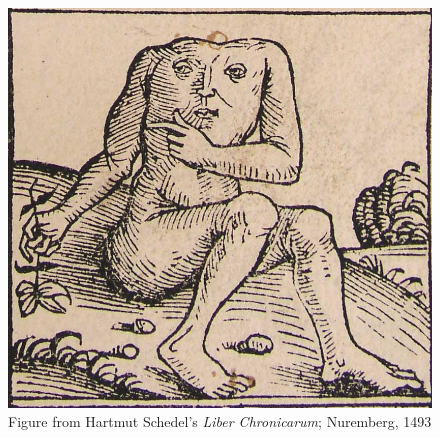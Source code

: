 \documentclass[output=paper
  ,nobabel
  ,draftmode
  ,colorlinks, citecolor=brown
]{langscibook}
\begin{document}
  
\begin{figure}
\includegraphics[width=\textwidth]{Figures/nuremberg-chronicles-strange-people-headless.jpg}
 
\caption{Figure from Hartmut Schedel's \emph{Liber Chronicarum}; Nuremberg, 1493}\label{fig-headless}
\end{figure}


\section*{\acknowledgmentsEN}


\nocite{chapters/lander,chapters/salzmann,chapters/mueller,chapters/demske,chapters/korth,chapters/haider,chapters/raffelsiefen,chapters/noel,chapters/buecker,chapters/nolda}




{\sloppy
\printbibliography[heading=subbibliography,notkeyword=this]
}
\end{document}
